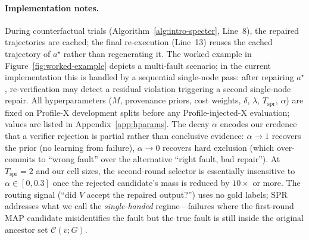 \documentclass{article}
\begin{document}
\paragraph{Implementation notes.} During counterfactual trials (Algorithm~\ref{alg:intro-specter}, Line~8), the repaired trajectories are cached; the final re-execution (Line~13) reuses the cached trajectory of $a^\star$ rather than regenerating it. The worked example in Figure~\ref{fig:worked-example} depicts a multi-fault scenario; in the current implementation this is handled by a sequential single-node pass: after repairing $a^\star$, re-verification may detect a residual violation triggering a second single-node repair. All hyperparameters ($M$, provenance priors, cost weights, $\delta$, $\lambda$, $T_{\text{spr}}$, $\alpha$) are fixed on Profile-X development splits before any Profile-injected-X evaluation; values are listed in Appendix~\ref{app:hparams}. The decay $\alpha$ encodes our credence that a verifier rejection is partial rather than conclusive evidence: $\alpha{\to}1$ recovers the prior (no learning from failure), $\alpha{\to}0$ recovers hard exclusion (which over-commits to ``wrong fault'' over the alternative ``right fault, bad repair''). At $T_{\text{spr}} = 2$ and our cell sizes, the second-round selector is essentially insensitive to $\alpha \in [0, 0.3]$ once the rejected candidate's mass is reduced by $10\times$ or more. The routing signal (``did $V$ accept the repaired output?'') uses no gold labels; SPR addresses what we call the \emph{single-handed} regime---failures where the first-round MAP candidate misidentifies the fault but the true fault is still inside the original ancestor set $\mathcal{C}(v;G)$.
\end{document}
